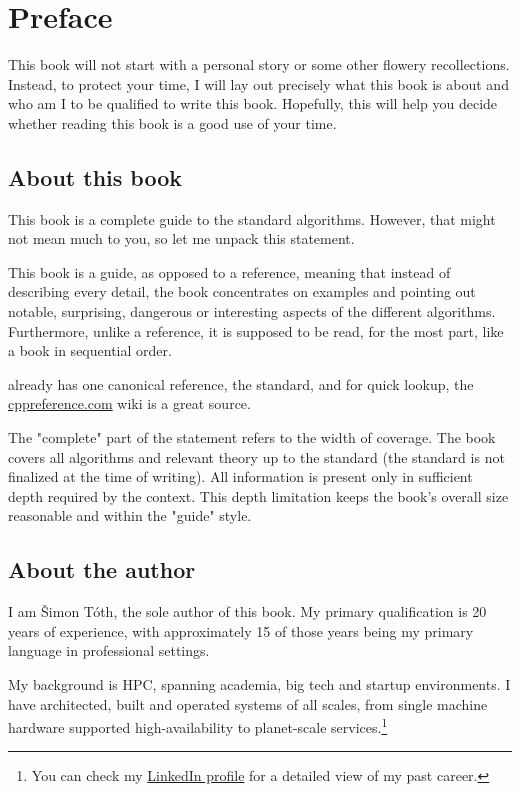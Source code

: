 \chapter{Preface}

This book will not start with a personal story or some other flowery recollections. Instead, to protect your time, I will lay out precisely what this book is about and who am I to be qualified to write this book. Hopefully, this will help you decide whether reading this book is a good use of your time.

\section*{About this book}

This book is a complete guide to the \CC standard algorithms. However, that might not mean much to you, so let me unpack this statement.

This book is a guide, as opposed to a reference, meaning that instead of describing every detail, the book concentrates on examples and pointing out notable, surprising, dangerous or interesting aspects of the different algorithms. Furthermore, unlike a reference, it is supposed to be read, for the most part, like a book in sequential order.

\CC already has one canonical reference, the \CC standard, and for quick lookup, the \href{https://cppreference.com}{cppreference.com} wiki is a great source.

The "complete" part of the statement refers to the width of coverage. The book covers all algorithms and relevant theory up to the  standard (the  standard is not finalized at the time of writing). All information is present only in sufficient depth required by the context. This depth limitation keeps the book's overall size reasonable and within the "guide" style.

\section*{About the author}

I am Šimon Tóth, the sole author of this book. My primary qualification is 20 years of \CC experience, with approximately 15 of those years \CC being my primary language in professional settings.

My background is HPC, spanning academia, big tech and startup environments. I have architected, built and operated systems of all scales, from single machine hardware supported high-availability to planet-scale services.\footnote{You can check my \href{https://cz.linkedin.com/in/simontoth}{LinkedIn profile} for a detailed view of my past career.}

